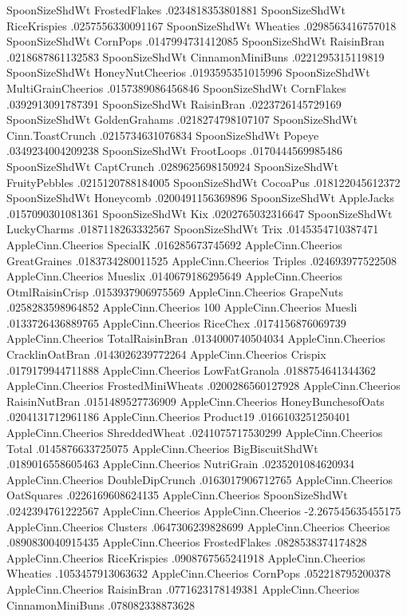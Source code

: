 SpoonSizeShdWt	FrostedFlakes	.0234818353801881
SpoonSizeShdWt	RiceKrispies	.0257556330091167
SpoonSizeShdWt	Wheaties	.0298563416757018
SpoonSizeShdWt	CornPops	.0147994731412085
SpoonSizeShdWt	RaisinBran	.0218687861132583
SpoonSizeShdWt	CinnamonMiniBuns	.0221295315119819
SpoonSizeShdWt	HoneyNutCheerios	.0193595351015996
SpoonSizeShdWt	MultiGrainCheerios	.0157389086456846
SpoonSizeShdWt	CornFlakes	.0392913091787391
SpoonSizeShdWt	RaisinBran	.0223726145729169
SpoonSizeShdWt	GoldenGrahams	.0218274798107107
SpoonSizeShdWt	Cinn.ToastCrunch	.0215734631076834
SpoonSizeShdWt	Popeye	.0349234004209238
SpoonSizeShdWt	FrootLoops	.0170444569985486
SpoonSizeShdWt	CaptCrunch	.0289625698150924
SpoonSizeShdWt	FruityPebbles	.0215120788184005
SpoonSizeShdWt	CocoaPus	.018122045612372
SpoonSizeShdWt	Honeycomb	.0200491156369896
SpoonSizeShdWt	AppleJacks	.0157090301081361
SpoonSizeShdWt	Kix	.0202765032316647
SpoonSizeShdWt	LuckyCharms	.0187118263332567
SpoonSizeShdWt	Trix	.0145354710387471
AppleCinn.Cheerios	SpecialK	.016285673745692
AppleCinn.Cheerios	GreatGraines	.0183734280011525
AppleCinn.Cheerios	Triples	.024693977522508
AppleCinn.Cheerios	Mueslix	.0140679186295649
AppleCinn.Cheerios	OtmlRaisinCrisp	.0153937906975569
AppleCinn.Cheerios	GrapeNuts	.0258283598964852
AppleCinn.Cheerios	100%
AppleCinn.Cheerios	Muesli	.0133726436889765
AppleCinn.Cheerios	RiceChex	.0174156876069739
AppleCinn.Cheerios	TotalRaisinBran	.0134000740504034
AppleCinn.Cheerios	CracklinOatBran	.0143026239772264
AppleCinn.Cheerios	Crispix	.0179179944711888
AppleCinn.Cheerios	LowFatGranola	.0188754641344362
AppleCinn.Cheerios	FrostedMiniWheats	.0200286560127928
AppleCinn.Cheerios	RaisinNutBran	.0151489527736909
AppleCinn.Cheerios	HoneyBunchesofOats	.0204131712961186
AppleCinn.Cheerios	Product19	.0166103251250401
AppleCinn.Cheerios	ShreddedWheat	.0241075717530299
AppleCinn.Cheerios	Total	.0145876633725075
AppleCinn.Cheerios	BigBiscuitShdWt	.0189016558605463
AppleCinn.Cheerios	NutriGrain	.0235201084620934
AppleCinn.Cheerios	DoubleDipCrunch	.0163017906712765
AppleCinn.Cheerios	OatSquares	.0226169608624135
AppleCinn.Cheerios	SpoonSizeShdWt	.0242394761222567
AppleCinn.Cheerios	AppleCinn.Cheerios	-2.267545635455175
AppleCinn.Cheerios	Clusters	.0647306239828699
AppleCinn.Cheerios	Cheerios	.0890830040915435
AppleCinn.Cheerios	FrostedFlakes	.0828538374174828
AppleCinn.Cheerios	RiceKrispies	.0908767565241918
AppleCinn.Cheerios	Wheaties	.1053457913063632
AppleCinn.Cheerios	CornPops	.052218795200378
AppleCinn.Cheerios	RaisinBran	.0771623178149381
AppleCinn.Cheerios	CinnamonMiniBuns	.078082338873628
